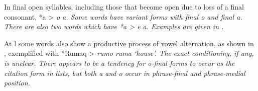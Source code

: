 In final open syllables,
including those that become open due to loss of a final consonant,
*a > \it{o {\tl} a}.
Some words have variant forms with final \it{o} and final \it{a}.
There are also two words which have *a > \it{e {\tl} a.} Examples
are given in .


At l some words also show a productive process of vowel alternation,
as shown in ,
exemplified with *Rumaq > \it{rumo {\tl} ruma} ‘house’.
The exact conditioning, if any, is unclear.
There appears to be a tendency for \it{o}-final forms to occur
as the citation form in lists,
but both \it{a} and \it{o} occur in phrase-final
and phrase-medial position.

